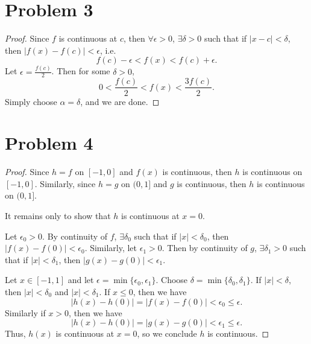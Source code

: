 \documentclass{article}
\begin{document}
\section*{Problem 3}
\begin{proof}
	Since $f$ is continuous at $c$, then $\forall \epsilon > 0 $, $\exists \delta > 0$ such that if $|x - c| < \delta$, then $|f(x) - f(c)| < \epsilon$, i.e.
	\begin{equation}
		f(c) - \epsilon < f(x) < f(c) + \epsilon.
	\end{equation}
	Let $\epsilon = \frac{f(c)}{2}$. Then for some $\delta > 0$,
	\begin{equation}
		0 < \frac{f(c)}{2} < f(x) < \frac{3 f(c)}{2}.
	\end{equation}
	Simply choose $\alpha = \delta$, and we are done.
\end{proof}
\section*{Problem 4}
\begin{proof}
	Since $h = f$ on $[-1, 0]$ and $f(x)$ is continuous, then $h$ is continuous on $[-1, 0]$. Similarly, since $h = g$ on $(0, 1]$ and $g$ is continuous, then $h$ is continuous on $(0, 1]$. 
	
	It remains only to show that $h$ is continuous at $x = 0$.
	
	Let $\epsilon_0 > 0$. By continuity of $f$, $\exists \delta_0$ such that if $|x| < \delta_0$, then $|f(x) - f(0)| < \epsilon_0$. Similarly, let $\epsilon_1 >0$. Then by continuity of $g$, $\exists \delta_1 > 0$ such that if $|x| < \delta_1$, then $|g(x) - g(0)| < \epsilon_1$.
	
	Let $x \in [-1, 1]$ and let $\epsilon = \min\{\epsilon_0, \epsilon_1\}$. Choose $\delta = \min\{\delta_0, \delta_1\}$. If $|x| < \delta$, then $|x| < \delta_0$ and $|x| < \delta_1$. If $x \leq 0$, then we have
	\begin{equation}
		|h(x) - h(0)| = |f(x) - f(0)| < \epsilon_0 \leq \epsilon.
	\end{equation}
	Similarly if $x > 0$, then we have
	\begin{equation}
		|h(x) - h(0)| = |g(x) - g(0)| < \epsilon_1 \leq \epsilon.
	\end{equation}
	Thus, $h(x)$ is continuous at $x=0$, so we conclude $h$ is continuous.
\end{proof}
\end{document}
